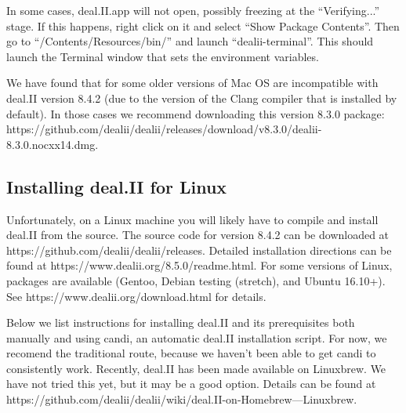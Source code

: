 \documentclass[10pt]{article} %
\begin{document}
In some cases, deal.II.app will not open, possibly freezing at the ``Verifying...'' stage. If this happens, right click on it and select ``Show Package Contents''. Then go to ``/Contents/Resources/bin/'' and launch ``dealii-terminal''. This should launch the Terminal window that sets the environment variables.

We have found that for some older versions of Mac OS are incompatible with deal.II version 8.4.2 (due to the version of the Clang compiler that is installed by default). In those cases we recommend downloading this version 8.3.0 package:
\\ https://github.com/dealii/dealii/releases/download/v8.3.0/dealii-8.3.0.nocxx14.dmg.

\subsection{Installing deal.II for Linux}
Unfortunately, on a Linux machine you will likely have to compile and install deal.II from the source. The source code for version 8.4.2 can be downloaded at https://github.com/dealii/dealii/releases. Detailed installation directions can be found at https://www.dealii.org/8.5.0/readme.html. For some versions of Linux, packages are available (Gentoo, Debian testing (stretch), and Ubuntu 16.10+). See https://www.dealii.org/download.html for details.

Below we list instructions for installing deal.II and its prerequisites both manually and using candi, an automatic deal.II installation script. For now, we recomend the traditional route, because we haven't been able to get candi to consistently work. Recently, deal.II has been made available on Linuxbrew. We have not tried this yet, but it may be a good option. Details can be found at https://github.com/dealii/dealii/wiki/deal.II-on-Homebrew---Linuxbrew.
\end{document}
